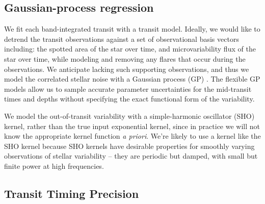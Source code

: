 \subsection{Gaussian-process regression}


We fit each band-integrated transit with a \citet{Mandel2002} transit model. Ideally, we would like to detrend the transit observations against a set of observational basis vectors including: the spotted area of the star over time, and microvariability flux of the star over time, while modeling and removing any flares that occur during the observations. We anticipate lacking such supporting observations, and thus we model the correlated stellar noise with a Gaussian process (GP) \citep{Foreman-Mackey2017}. The flexible GP models allow us to sample accurate parameter uncertainties for the mid-transit times and depths without specifying the exact functional form of the variability.

We model the out-of-transit variability with a simple-harmonic oscillator (SHO) kernel, rather than the true input exponential kernel, since in practice we will not know the appropriate kernel function \textit{a priori}. We're likely to use a kernel like the SHO kernel because SHO kernels have desirable properties for smoothly varying observations of stellar variability -- they are periodic but damped, with small but finite power at high frequencies.

\subsection{Transit Timing Precision}


